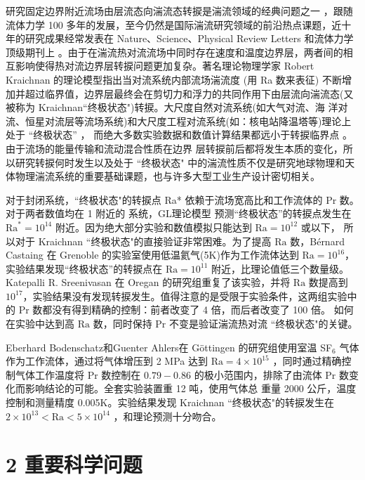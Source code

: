 \documentclass[10pt,aps]{article}
\def\Ra{\textrm{Ra}}
\def\Pr{\textrm{Pr}}
\begin{document}
{研究固定边界附近流场由层流态向湍流态转捩是湍流领域的经典问题之一 \cite{Rey1883}，跟随流体力学 100 多年的发展，至今仍然是国际湍流研究领域的前沿热点课题，近十年的研究成果经常发表在 Nature、Science、Physical Review Letters 和流体力学顶级期刊上 \cite{SK16,SHG16,LSAJAH16,Ba16,BSMLAH15,AMRH13,AMLABH11,HLATS10,ESHW07}。由于在湍流热对流流场中同时存在速度和温度边界层，两者间的相互影响使得热对流边界层转捩问题更加复杂。著名理论物理学家 Robert Kraichnan 的理论模型\cite{Kr62}指出当对流系统内部流场湍流度 (用 Ra 数来表征) 不断增加并超过临界值，边界层最终会在剪切力和浮力的共同作用下由层流向湍流态(又被称为 Kraichnan``终极状态")转捩。大尺度自然对流系统(如大气对流、海 洋对流、恒星对流层等流场系统)\cite{Sp71}和大尺度工程对流系统(如：核电站降温塔等)理论上处于 “终极状态” ， 而绝大多数实验数据和数值计算结果都远小于转捩临界点 \cite{AGL09,Ah09}。由于流场的能量传输和流动混合性质在边界 层转捩前后都将发生本质的变化，所以研究转捩何时发生以及处于 ``终极状态" 中的湍流性质不仅是研究地球物理和天体物理湍流系统的重要基础课题，也与许多大型工业生产设计密切相关。
\vskip 6pt

 对于封闭系统，``终极状态"的转捩点 Ra* 依赖于流场宽高比和工作流体的 Pr 数。对于两者数值均在 1 附近的 系统，GL理论模型\cite{GL00,GL01} 预测“终极状态”的转捩点发生在 $\Ra^* = 10^{14}$ 附近。因为绝大部分实验和数值模拟只能达到 $\Ra = 10^{12}$ 或以下， 所以对于 Kraichnan ``终极状态"的直接验证非常困难。为了提高 $\Ra$ 数，B\'ernard Castaing 在 Grenoble 的实验室使用低温氦气(5K)作为工作流体达到 $\Ra = 10^{16}$，实验结果发现“终极状态”的转捩点在 $\Ra = 10^{11}$ 附近，比理论值低三个数量级\cite{CCCHCC97,CCCCH01}。Katepalli R. Sreenivasan 在 Oregan 的研究组重复了该实验，并将 $\Ra$ 数提高到 $10^{17}$，实验结果没有发现转捩发生\cite{NSSD00}。值得注意的是受限于实验条件，这两组实验中的 $\Pr$ 数都没有得到精确的控制：前者改变了 4 倍，而后者改变了 100 倍。 如何在实验中达到高 $\Ra$ 数，同时保持 $\Pr$ 不变是验证湍流热对流 ``终极状态"的关键。
\vskip 6pt

Eberhard Bodenschatz和Guenter Ahlers在 G\"ottingen 的研究组使用室温 SF$_6$ 气体作为工作流体，通过将气体增压到 2 MPa 达到 $\Ra = 4 \times 10^{15}$ ，同时通过精确控制气体工作温度将 $\Pr$ 数控制在 $0.79 - 0.86$ 的极小范围内，排除了由流体 $\Pr$ 数变化而影响结论的可能。全套实验装置重 12 吨，使用气体总 重量 2000 公斤，温度控制和测量精度 0.005K。实验结果发现 Kraichnan ``终极状态"的转捩发生在$2 \times 10^{13} < \Ra < 5 \times 10^{14}$ \cite{HFNBA12,HFBA12,AHFB12}，和理论预测\cite{GL01}十分吻合。


\section*{2 重要科学问题}

}
\end{document}
